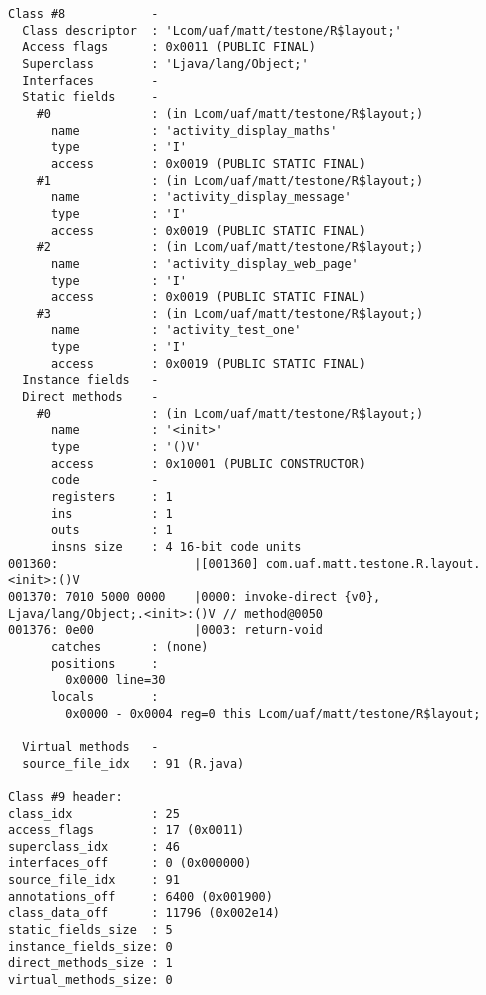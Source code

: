 \begin{lstlisting}
Class #8            -
  Class descriptor  : 'Lcom/uaf/matt/testone/R$layout;'
  Access flags      : 0x0011 (PUBLIC FINAL)
  Superclass        : 'Ljava/lang/Object;'
  Interfaces        -
  Static fields     -
    #0              : (in Lcom/uaf/matt/testone/R$layout;)
      name          : 'activity_display_maths'
      type          : 'I'
      access        : 0x0019 (PUBLIC STATIC FINAL)
    #1              : (in Lcom/uaf/matt/testone/R$layout;)
      name          : 'activity_display_message'
      type          : 'I'
      access        : 0x0019 (PUBLIC STATIC FINAL)
    #2              : (in Lcom/uaf/matt/testone/R$layout;)
      name          : 'activity_display_web_page'
      type          : 'I'
      access        : 0x0019 (PUBLIC STATIC FINAL)
    #3              : (in Lcom/uaf/matt/testone/R$layout;)
      name          : 'activity_test_one'
      type          : 'I'
      access        : 0x0019 (PUBLIC STATIC FINAL)
  Instance fields   -
  Direct methods    -
    #0              : (in Lcom/uaf/matt/testone/R$layout;)
      name          : '<init>'
      type          : '()V'
      access        : 0x10001 (PUBLIC CONSTRUCTOR)
      code          -
      registers     : 1
      ins           : 1
      outs          : 1
      insns size    : 4 16-bit code units
001360:                   |[001360] com.uaf.matt.testone.R.layout.<init>:()V
001370: 7010 5000 0000    |0000: invoke-direct {v0}, Ljava/lang/Object;.<init>:()V // method@0050
001376: 0e00              |0003: return-void
      catches       : (none)
      positions     :
        0x0000 line=30
      locals        :
        0x0000 - 0x0004 reg=0 this Lcom/uaf/matt/testone/R$layout;

  Virtual methods   -
  source_file_idx   : 91 (R.java)

Class #9 header:
class_idx           : 25
access_flags        : 17 (0x0011)
superclass_idx      : 46
interfaces_off      : 0 (0x000000)
source_file_idx     : 91
annotations_off     : 6400 (0x001900)
class_data_off      : 11796 (0x002e14)
static_fields_size  : 5
instance_fields_size: 0
direct_methods_size : 1
virtual_methods_size: 0


\end{lstlisting}
